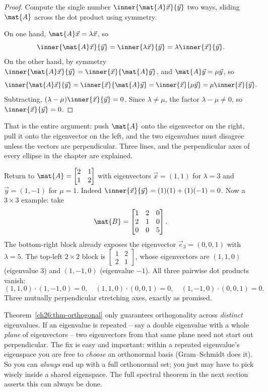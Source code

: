 \begin{proof}
Compute the single number $\inner{\mat{A}\vec{x}}{\vec{y}}$ two ways, sliding
$\mat{A}$ across the dot product using symmetry.

On one hand, $\mat{A}\vec{x}=\lambda\vec{x}$, so
\[
  \inner{\mat{A}\vec{x}}{\vec{y}} = \inner{\lambda\vec{x}}{\vec{y}} = \lambda\inner{\vec{x}}{\vec{y}}.
\]
On the other hand, by symmetry $\inner{\mat{A}\vec{x}}{\vec{y}}=\inner{\vec{x}}{\mat{A}\vec{y}}$,
and $\mat{A}\vec{y}=\mu\vec{y}$, so
\[
  \inner{\mat{A}\vec{x}}{\vec{y}} = \inner{\vec{x}}{\mat{A}\vec{y}} = \inner{\vec{x}}{\mu\vec{y}} = \mu\inner{\vec{x}}{\vec{y}}.
\]
Subtracting, $(\lambda-\mu)\inner{\vec{x}}{\vec{y}} = 0$. Since $\lambda\neq\mu$,
the factor $\lambda-\mu\neq 0$, so $\inner{\vec{x}}{\vec{y}}=0$.
\end{proof}

That is the entire argument: push $\mat{A}$ onto the eigenvector on the right, pull
it onto the eigenvector on the left, and the two eigenvalues must disagree unless
the vectors are perpendicular. Three lines, and the perpendicular axes of every
ellipse in the chapter are explained.

\begin{example}
\label{ch26:ex-ortho}
Return to $\mat{A}=\begin{bmatrix}2&1\\1&2\end{bmatrix}$ with eigenvectors
$\vec{x}=(1,1)$ for $\lambda=3$ and $\vec{y}=(1,-1)$ for $\mu=1$. Indeed
$\inner{\vec{x}}{\vec{y}} = (1)(1)+(1)(-1) = 0$. Now a $3\times 3$ example: take
\[
  \mat{B} = \begin{bmatrix} 1 & 2 & 0 \\ 2 & 1 & 0 \\ 0 & 0 & 5 \end{bmatrix}.
\]
The bottom-right block already exposes the eigenvector $\vec{e}_3=(0,0,1)$ with
$\lambda=5$. The top-left $2\times 2$ block is $\begin{bmatrix}1&2\\2&1\end{bmatrix}$,
whose eigenvectors are $(1,1,0)$ (eigenvalue $3$) and $(1,-1,0)$ (eigenvalue
$-1$). All three pairwise dot products vanish:
\[
  (1,1,0)\cdot(1,-1,0)=0,\quad (1,1,0)\cdot(0,0,1)=0,\quad (1,-1,0)\cdot(0,0,1)=0.
\]
Three mutually perpendicular stretching axes, exactly as promised.
\end{example}

\begin{trapbox}
Theorem~\ref{ch26:thm-orthogonal} only guarantees orthogonality across
\emph{distinct} eigenvalues. If an eigenvalue is repeated -- say a double
eigenvalue with a whole \emph{plane} of eigenvectors -- two eigenvectors from that
same plane need not start out perpendicular. The fix is easy and important: within
a repeated eigenvalue's eigenspace you are free to \emph{choose} an orthonormal
basis (Gram--Schmidt does it). So you can \emph{always} end up with a full
orthonormal set; you just may have to pick wisely inside a shared eigenspace. The
full spectral theorem in the next section asserts this can always be done.
\end{trapbox}

